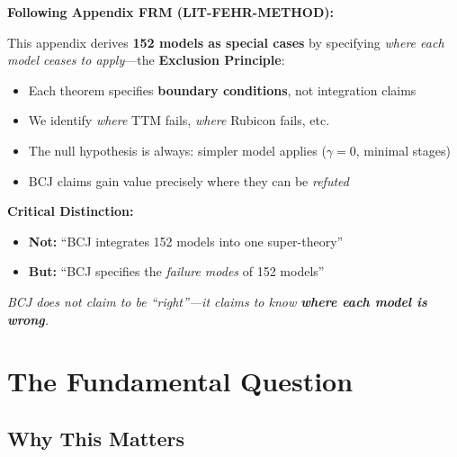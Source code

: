 \begin{tcolorbox}[colback=red!5!white, colframe=red!75!black,
    title=\textbf{Methodological Note: Boundary Specification, Not Integration}]

\textbf{Following Appendix FRM (LIT-FEHR-METHOD):}

This appendix derives \textbf{152 models as special cases} by specifying \textit{where each model ceases to apply}---the \textbf{Exclusion Principle}:

\begin{itemize}[nosep]
    \item Each theorem specifies \textbf{boundary conditions}, not integration claims
    \item We identify \textit{where} TTM fails, \textit{where} Rubicon fails, etc.
    \item The null hypothesis is always: simpler model applies ($\gamma = 0$, minimal stages)
    \item BCJ claims gain value precisely where they can be \textit{refuted}
\end{itemize}

\medskip
\textbf{Critical Distinction:}
\begin{itemize}[nosep]
    \item \textbf{Not:} ``BCJ integrates 152 models into one super-theory''
    \item \textbf{But:} ``BCJ specifies the \textit{failure modes} of 152 models''
\end{itemize}

\textit{BCJ does not claim to be ``right''---it claims to know \textbf{where each model is wrong}.}
\end{tcolorbox}



\section{The Fundamental Question}
\label{sec:bcj-fundamental}

\subsection{Why This Matters}


